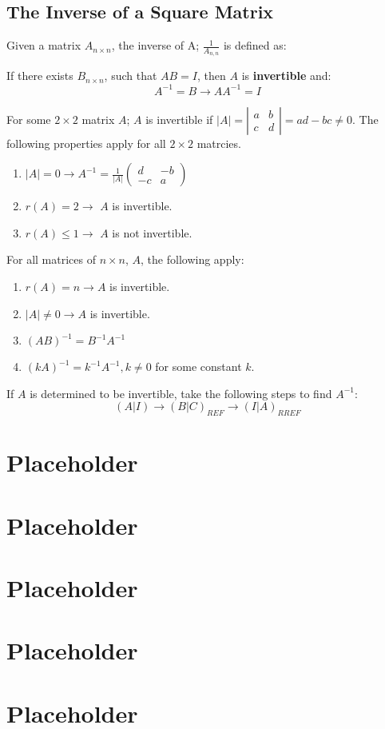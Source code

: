 \documentclass[a4paper]{article}
\begin{document}
  \subsection{The Inverse of a Square Matrix}
  Given a matrix $A_{n\times n}$, the inverse of A; $\frac{1 }{A_{n,n}}$ is defined as:
  \begin{defn}
    If there exists $B_{n\times n}$, such that $AB=I$, then $A$ is \textbf{invertible} and:
    \[
      A^{-1}=B\rightarrow AA^{-1} = I
    \]
  \end{defn}
  \newpage
  \noindent
  For some $2\times 2$ matrix $A$; $A$ is invertible if $|A| = |\begin{smallmatrix} a & b \\ c & d \end{smallmatrix}| = ad - bc \neq 0$. The following properties apply for all $2\times 2$ matrcies.
  \begin{enumerate}
    \item $|A| = 0 \rightarrow A^{-1} = \frac{1 }{|A|} \begin{pmatrix}
        d & -b \\
        -c & a
    \end{pmatrix}$
  \item $r(A) = 2 \rightarrow$ $A$ is invertible.
  \item $r(A) \le 1 \rightarrow$ $A$ is not invertible.
  \end{enumerate}
  For all matrices of $n \times n$, $A$, the following apply:
  \begin{enumerate}
    \item $r(A) = n \rightarrow A$ is invertible.
    \item $|A| \neq 0 \rightarrow A$ is invertible.
    \item $(AB)^{-1} = B^{-1}A^{-1}$
    \item $(kA)^{-1} = k^{-1}A^{-1}, k \neq 0$ for some constant $k$.
  \end{enumerate}
  If $A$ is determined to be invertible, take the following steps to find $A^{-1}$:
  \[
    (A|I) \rightarrow (B|C)_{REF} \rightarrow (I|A)_{RREF}
  \]
  \section{Placeholder} 
  \section{Placeholder} 
  \section{Placeholder} 
  \section{Placeholder} 
  \section{Placeholder} 
\end{document}
